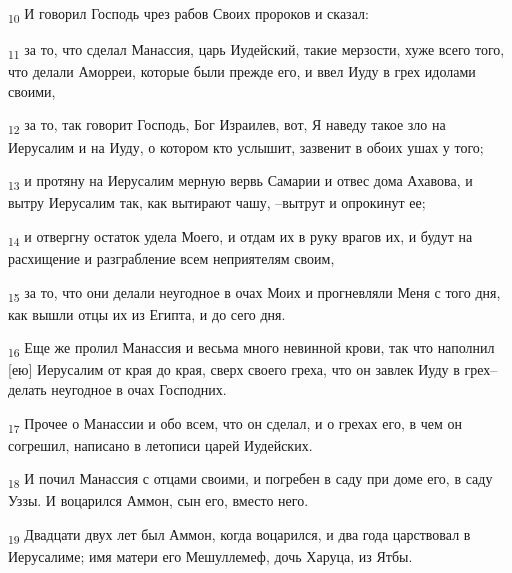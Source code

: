\begin{tcolorbox}
\textsubscript{10} И говорил Господь чрез рабов Своих пророков и сказал:
\end{tcolorbox}
\begin{tcolorbox}
\textsubscript{11} за то, что сделал Манассия, царь Иудейский, такие мерзости, хуже всего того, что делали Аморреи, которые были прежде его, и ввел Иуду в грех идолами своими,
\end{tcolorbox}
\begin{tcolorbox}
\textsubscript{12} за то, так говорит Господь, Бог Израилев, вот, Я наведу такое зло на Иерусалим и на Иуду, о котором кто услышит, зазвенит в обоих ушах у того;
\end{tcolorbox}
\begin{tcolorbox}
\textsubscript{13} и протяну на Иерусалим мерную вервь Самарии и отвес дома Ахавова, и вытру Иерусалим так, как вытирают чашу, --вытрут и опрокинут ее;
\end{tcolorbox}
\begin{tcolorbox}
\textsubscript{14} и отвергну остаток удела Моего, и отдам их в руку врагов их, и будут на расхищение и разграбление всем неприятелям своим,
\end{tcolorbox}
\begin{tcolorbox}
\textsubscript{15} за то, что они делали неугодное в очах Моих и прогневляли Меня с того дня, как вышли отцы их из Египта, и до сего дня.
\end{tcolorbox}
\begin{tcolorbox}
\textsubscript{16} Еще же пролил Манассия и весьма много невинной крови, так что наполнил [ею] Иерусалим от края до края, сверх своего греха, что он завлек Иуду в грех--делать неугодное в очах Господних.
\end{tcolorbox}
\begin{tcolorbox}
\textsubscript{17} Прочее о Манассии и обо всем, что он сделал, и о грехах его, в чем он согрешил, написано в летописи царей Иудейских.
\end{tcolorbox}
\begin{tcolorbox}
\textsubscript{18} И почил Манассия с отцами своими, и погребен в саду при доме его, в саду Уззы. И воцарился Аммон, сын его, вместо него.
\end{tcolorbox}
\begin{tcolorbox}
\textsubscript{19} Двадцати двух лет был Аммон, когда воцарился, и два года царствовал в Иерусалиме; имя матери его Мешуллемеф, дочь Харуца, из Ятбы.
\end{tcolorbox}
